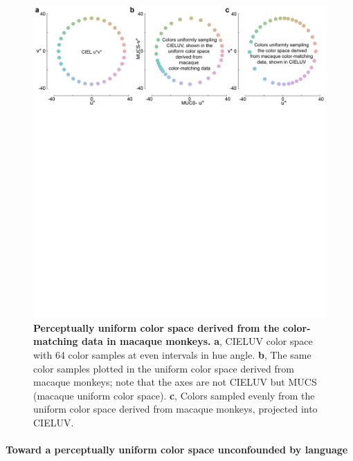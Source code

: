 \documentclass[9pt,biorxiv,lineno,onehalfspacing]{lapreprint}
\begin{document}
\begin{refsection}
\begin{figure}
    \begin{fullwidth}
    \centering
      \includegraphics[width=\textwidth+4cm,trim={0 15cm 0 0},clip]{F6_ColSpace_2}
           \caption{\textbf{Perceptually uniform color space derived from the color-matching data in macaque monkeys.} 
			\textbf{a}, CIELUV color space with 64 color samples at even intervals in hue angle. 
			\textbf{b}, The same color samples plotted in the uniform color space derived from macaque monkeys; note that the axes are not CIELUV but MUCS (macaque uniform color space). 
			\textbf{c}, Colors sampled evenly from the uniform color space derived from macaque monkeys, projected into CIELUV.}
		\label{fig:MACBEHcolorspace}
    \end{fullwidth}
\end{figure}

\paragraph{Toward a perceptually uniform color space unconfounded by language}


\end{refsection}
\end{document}
